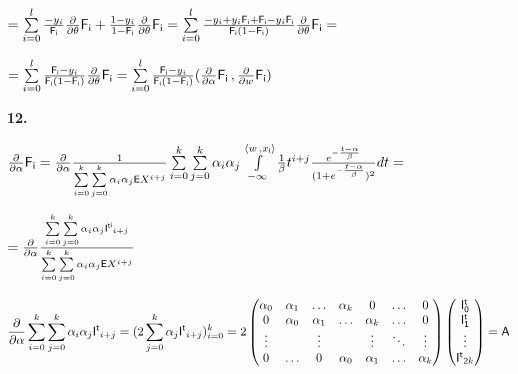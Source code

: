 \documentclass[a4paper,12pt]{article}
\begin{document}
\begin{center}
    $= \sum\limits_{i = 0}^l {-y_i\over{\mathsf{F_i}}} {\partial\over{\partial \theta}} \mathsf{F_i} + {1 - y_i\over{1 - \mathsf{F_i}}} {\partial\over{\partial \theta}} \mathsf{F_i} = \sum\limits_{i = 0}^l {-y_i + y_i \mathsf{F_i} + \mathsf{F_i} - y_i \mathsf{F_i}\over{\mathsf{F_i} (1 - \mathsf{F_i})}} {\partial\over{\partial \theta}} \mathsf{F_i} =$
\end{center}

\begin{center}
    $= \sum\limits_{i = 0}^l {\mathsf{F_i} -y_i\over{\mathsf{F_i} (1 - \mathsf{F_i})}} {\partial\over{\partial \theta}} \mathsf{F_i} = \sum\limits_{i = 0}^l {\mathsf{F_i} -y_i\over{\mathsf{F_i} (1 - \mathsf{F_i})}} ({\partial\over{\partial \alpha}} \mathsf{F_i}\,, {\partial\over{\partial w}} \mathsf{F_i})$
\end{center}

\noindent\textbf{12.}

\begin{center}
    ${\partial\over{\partial \alpha}} \mathsf{F_i} = {\partial\over{\partial \alpha}} {1\over{\sum\limits_{i = 0}^k}\sum\limits_{j=0}^k\alpha_i \alpha_j \mathsf{E}X^{i + j}} \sum\limits_{i = 0}^k \sum\limits_{j = 0}^k \alpha_i \alpha_j \int\limits_{-\infty}^{\langle w \,, x_{\mathsf{i}}\rangle} {1\over{\beta}} t^{i + j} {e^{-{t - \alpha\over{\beta}}}\over{(1 + e^{-{t - \alpha\over{\beta}}}})^2} d t = $
\end{center}

\begin{center}
    $= {\partial\over{\partial \alpha}} {\sum\limits_{i = 0}^k \sum\limits_{j = 0}^k \alpha_i \alpha_j \mathsf{I^{ti}}_{i + j}\over{\sum\limits_{i = 0}^k}\sum\limits_{j=0}^k\alpha_i \alpha_j \mathsf{E}X^{i + j}} $
\end{center}

\begin{displaymath}
    {\partial\over{\partial \alpha}} \sum\limits_{i = 0}^k \sum\limits_{j = 0}^k \alpha_i \alpha_j \mathsf{I^{t}}_{i + j} = (2 \sum\limits_{j = 0}^k \alpha_j \mathsf{I^{t}}_{i + j})_{i = 0}^k
    = 2\begin{pmatrix}
        \alpha_0 & \alpha_1 & \ldots & \alpha_k & 0 & \ldots & 0 \\
        0 & \alpha_0 & \alpha_1 & \ldots & \alpha_k & \ldots & 0 \\
        \vdots &  & \vdots &  & \vdots & \ddots & \vdots\\
        0 & \ldots & 0 & \alpha_0 & \alpha_1 &\ldots & \alpha_k \\
    \end{pmatrix} \begin{pmatrix}
        \mathsf{I^t_0} \\ \mathsf{I^t_1} \\ \vdots \\ \mathsf{I^t}_{\mathsf{2}k} \\
    \end{pmatrix} = \mathsf{A}
\end{displaymath}
\end{document}
